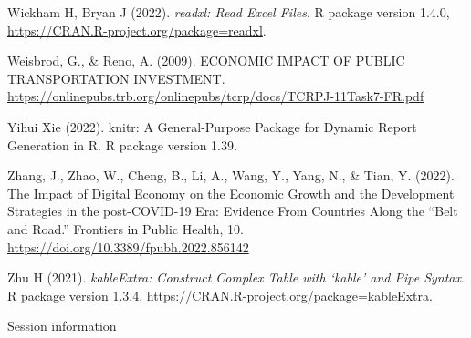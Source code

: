 \documentclass[
]{article}
\begin{document}
Wickham H, Bryan J (2022). \emph{readxl: Read Excel Files}. R package version 1.4.0,
\url{https://CRAN.R-project.org/package=readxl}.

Weisbrod, G., \& Reno, A. (2009). ECONOMIC IMPACT OF PUBLIC TRANSPORTATION INVESTMENT. \url{https://onlinepubs.trb.org/onlinepubs/tcrp/docs/TCRPJ-11Task7-FR.pdf}

Yihui Xie (2022). knitr: A General-Purpose Package for Dynamic Report Generation in R. R
package version 1.39.

Zhang, J., Zhao, W., Cheng, B., Li, A., Wang, Y., Yang, N., \& Tian, Y. (2022). The Impact of Digital Economy on the Economic Growth and the Development Strategies in the post-COVID-19 Era: Evidence From Countries Along the ``Belt and Road.'' Frontiers in Public Health, 10. \url{https://doi.org/10.3389/fpubh.2022.856142}

Zhu H (2021). \emph{kableExtra: Construct Complex Table with `kable' and Pipe Syntax}. R
package version 1.3.4, \url{https://CRAN.R-project.org/package=kableExtra}.

Session information
\end{document}

